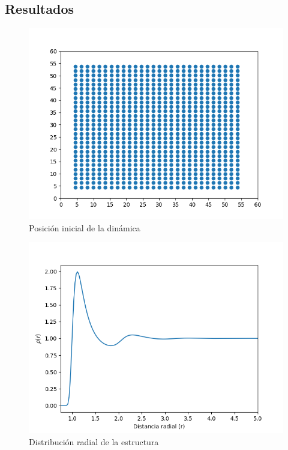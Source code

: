 \documentclass[12pt,letterpaper]{article}
\begin{document}
\begin{multicols}{2}
\section*{Resultados}
\begin{figure}[H]
    \centering
    \includegraphics[scale=0.45]{../Graphics/Cor_in.png}
    \caption{Posición inicial de la dinámica}
    \label{pos inicial}
\end{figure}
\begin{figure}[H]
    \centering
    \includegraphics[scale=0.45]{../Graphics/Dis_rad.png}
    \caption{Distribución radial de la estructura}
    \label{distribucion radial}
\end{figure}
\begin{figure}[H]

\end{figure}
\end{multicols}
\end{document}
